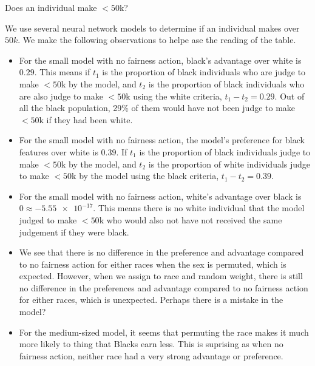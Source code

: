 \documentclass{article}
\begin{document}
\begin{table}[h!]
	\centering
	\caption{Does an individual make $<50$k?}
\end{table}

We use several neural network models to determine if an individual
makes over $50k$.
We make the following observations to helpe ase the reading of the table.
\begin{itemize}
	\item For the small model with no fairness action,
		black's advantage over white is $0.29$. This means
		if $t_1$ is the proportion of black individuals who
		are judge to make $<50$k by the model,
		and $t_2$ is the proportion of black individuals who
		are also judge to make $<50$k using the white
		criteria, $t_1 - t_2 = 0.29$. Out of all the black
		population, 29\% of them would have not been judge to
		make $<50$k if they had been white.
	\item For the small model with no fairness action, the
		model's preference for black features over white is
		$0.39$. If $t_1$ is the proportion of black
		individuals judge to make $<50$k by the
		model, and $t_2$ is the proportion of white
		individuals judge to make  $<50$k by the
		model using the black criteria, $t_1 - t_2=0.39$.
	\item For the small model with no fairness action,
		white's advantage over black is $0\approx
		\num{-5.55e-17}$. This means there is no
		white individual that the model judged to make
		$<50$k who would also not have not received
		the same judgement if they were black.
	\item We see that there is no difference in the preference and
		advantage compared to no fairness action for either races when
		the sex is permuted, which is expected. However, when we assign
		to race and random weight, there is still no difference  in the
		preferences and advantage compared to no fairness action for
		either races, which is unexpected. Perhaps there is a mistake
		in the model?
	\item For the medium-sized model, it seems that permuting the race
		makes it much more likely to thing that Blacks earn less. This
		is suprising as when no fairness action, neither race had a
		very strong advantage or preference.
\end{itemize}
\end{document}

